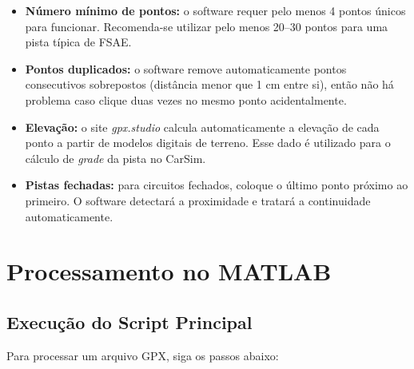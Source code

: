\documentclass[a4paper,12pt]{article}
\begin{document}
\begin{itemize}
    \item \textbf{Número mínimo de pontos:} o software requer pelo menos 4 pontos únicos para funcionar. Recomenda-se utilizar pelo menos 20--30 pontos para uma pista típica de FSAE.
    \item \textbf{Pontos duplicados:} o software remove automaticamente pontos consecutivos sobrepostos (distância menor que 1 cm entre si), então não há problema caso clique duas vezes no mesmo ponto acidentalmente.
    \item \textbf{Elevação:} o site \textit{gpx.studio} calcula automaticamente a elevação de cada ponto a partir de modelos digitais de terreno. Esse dado é utilizado para o cálculo de \textit{grade} da pista no CarSim.
    \item \textbf{Pistas fechadas:} para circuitos fechados, coloque o último ponto próximo ao primeiro. O software detectará a proximidade e tratará a continuidade automaticamente.
\end{itemize}


\section{Processamento no MATLAB}

\subsection{Execução do Script Principal}

Para processar um arquivo GPX, siga os passos abaixo:
\end{document}
